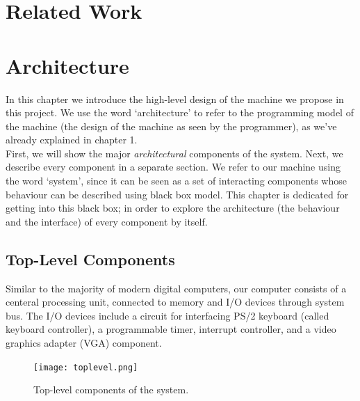 \documentclass[oneside]{book}
\begin{document}


\chapter{Related Work}


\chapter{Architecture}

In this chapter we introduce the high-level design of the machine
we propose in this project. We use the word `architecture' to refer
to the programming model of the machine (the design of the machine as
seen by the programmer), as we've already explained in chapter 1.\\

First, we will show the major \textit{architectural} components of the
system. Next, we describe every component
in a separate section. We refer to our machine using the word `system', 
since it can be seen as a set of interacting components whose behaviour can be
described using black box model. This chapter is dedicated for getting
into this black box; in order to explore the architecture (the behaviour
and the interface) of every component by itself.
 
\section{Top-Level Components}

Similar to the majority of modern digital computers, our computer consists
of a centeral processing unit, connected to memory and I/O devices
through system bus. The I/O devices include a circuit for interfacing
PS/2 keyboard (called keyboard controller), a programmable timer,
interrupt controller, and a video graphics adapter (VGA) component.\\

\begin{figure}[h]
\begin{center}
\texttt{[image: toplevel.png]}
\end{center}
\caption{Top-level components of the system.}
\label{toplevel}
\end{figure}
\end{document}
